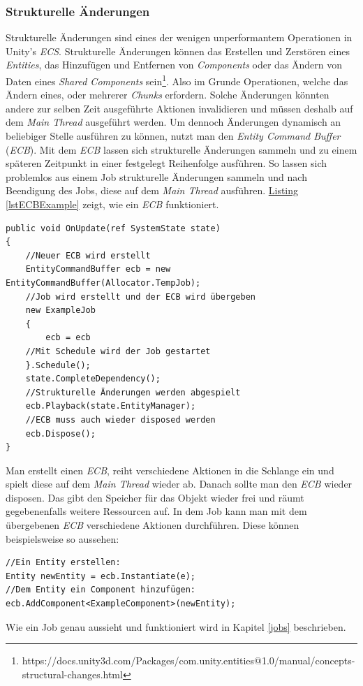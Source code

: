 \subsubsection{Strukturelle Änderungen}\label{structuralChanges}
Strukturelle Änderungen sind eines der wenigen unperformantem Operationen in Unity's \textit{ECS}. Strukturelle Änderungen können das Erstellen und Zerstören eines \textit{Entities}, das Hinzufügen und Entfernen von \textit{Components} oder das Ändern von Daten eines \textit{Shared Components} sein\footnote{https://docs.unity3d.com/Packages/com.unity.entities@1.0/manual/concepts-structural-changes.html}. Also im Grunde Operationen, welche das Ändern eines, oder mehrerer \textit{Chunks} erfordern. Solche Änderungen könnten andere zur selben Zeit ausgeführte Aktionen invalidieren und müssen deshalb auf dem \textit{Main Thread} ausgeführt werden. Um dennoch Änderungen dynamisch an beliebiger Stelle ausführen zu können, nutzt man den \textit{Entity Command Buffer} (\textit{ECB}). Mit dem \textit{ECB} lassen sich strukturelle Änderungen sammeln und zu einem späteren Zeitpunkt in einer festgelegt Reihenfolge ausführen. So lassen sich problemlos aus einem Job strukturelle Änderungen sammeln und nach Beendigung des Jobs, diese auf dem \textit{Main Thread} ausführen. \hyperref[lstECBExample]{Listing \ref*{lstECBExample}} zeigt, wie ein \textit{ECB} funktioniert.
\begin{lstlisting}[style=code, caption={[Beispiel eines \textit{Entity Command Buffers}]Beispiel eines \textit{Entity Command Buffers}. Der \textit{ECB} wird erstellt, es werden strukturelle Änderungen vorgenommen und diese werden auf dem \textit{Main Thread} abgespielt.}, label=lstECBExample]
public void OnUpdate(ref SystemState state)
{
    //Neuer ECB wird erstellt
    EntityCommandBuffer ecb = new EntityCommandBuffer(Allocator.TempJob);
    //Job wird erstellt und der ECB wird übergeben
    new ExampleJob
    {
        ecb = ecb
    //Mit Schedule wird der Job gestartet
    }.Schedule();
    state.CompleteDependency();
    //Strukturelle Änderungen werden abgespielt
    ecb.Playback(state.EntityManager);
    //ECB muss auch wieder disposed werden
    ecb.Dispose();
}
\end{lstlisting}
Man erstellt einen \textit{ECB}, reiht verschiedene Aktionen in die Schlange ein und spielt diese auf dem \textit{Main Thread} wieder ab. Danach sollte man den \textit{ECB} wieder disposen. Das gibt den Speicher für das Objekt wieder frei und räumt gegebenenfalls weitere Ressourcen auf. In dem Job kann man mit dem übergebenen \textit{ECB} verschiedene Aktionen durchführen. Diese können beispielsweise so aussehen:
\begin{lstlisting}[style=code]
//Ein Entity erstellen:
Entity newEntity = ecb.Instantiate(e);
//Dem Entity ein Component hinzufügen:
ecb.AddComponent<ExampleComponent>(newEntity);
\end{lstlisting}
Wie ein Job genau aussieht und funktioniert wird in Kapitel \ref{jobs} beschrieben.